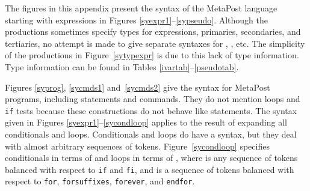 The figures in this appendix present the syntax of the MetaPost language
starting with expressions in Figures \ref{syexpr1}--\ref{sypseudo}.
Although the productions sometimes specify types for expressions, primaries,
secondaries, and tertiaries, no attempt is made to give separate syntaxes
for , , etc.
The simplicity of the productions in Figure~\ref{sytypexpr} is due to this
lack of type information.  Type information
can be found in Tables \ref{ivartab}--\ref{pseudotab}.

Figures \ref{syprog}, \ref{sycmds1} and~\ref{sycmds2} give the syntax
for MetaPost programs, including statements and commands.  They do not
mention loops and {\tt if} tests
because these constructions do not behave like statements.  The syntax
given in Figures \ref{syexpr1}--\ref{sycondloop} applies to the result
of expanding all conditionals and loops.  Conditionals and loops do have
a syntax, but they deal with almost arbitrary sequences of tokens.
Figure~\ref{sycondloop} specifies conditionals in terms of
 and loops in terms of , where
 is any sequence of tokens balanced with respect
to {\tt if} and {\tt fi}, and  is a sequence of tokens
balanced with respect to {\tt for}, {\tt forsuffixes}, {\tt forever},
and {\tt endfor}.

